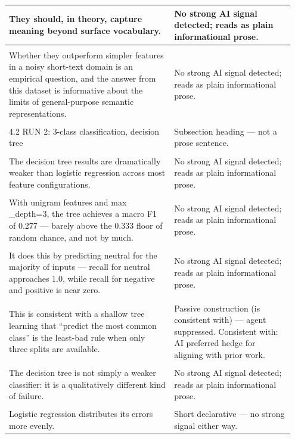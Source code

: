 \documentclass[11pt]{article}
\begin{document}
\begin{longtable}{|p{0.55\linewidth}|p{0.40\linewidth}|}
\hline
They should, in theory, capture meaning beyond surface vocabulary. & No strong AI signal detected; reads as plain informational prose. \\[2pt]
\hline
\rule{0pt}{3.5cm} & \\
\hline
Whether they outperform simpler features in a noisy short-text domain is an empirical question, and the answer from this dataset is informative about the limits of general-purpose semantic representations. & No strong AI signal detected; reads as plain informational prose. \\[2pt]
\hline
\rule{0pt}{3.5cm} & \\
\hline
4.2 RUN 2: 3-class classification, decision tree & Subsection heading --- not a prose sentence. \\[2pt]
\hline
\rule{0pt}{3.5cm} & \\
\hline
The decision tree results are dramatically weaker than logistic regression across most feature configurations. & No strong AI signal detected; reads as plain informational prose. \\[2pt]
\hline
\rule{0pt}{3.5cm} & \\
\hline
With unigram features and max \_depth=3, the tree achieves a macro F1 of 0.277 --- barely above the 0.333 floor of random chance, and not by much. & No strong AI signal detected; reads as plain informational prose. \\[2pt]
\hline
\rule{0pt}{3.5cm} & \\
\hline
It does this by predicting neutral for the majority of inputs --- recall for neutral approaches 1.0, while recall for negative and positive is near zero. & No strong AI signal detected; reads as plain informational prose. \\[2pt]
\hline
\rule{0pt}{3.5cm} & \\
\hline
This is consistent with a shallow tree learning that ``predict the most common class'' is the least-bad rule when only three splits are available. & Passive construction (is consistent with) --- agent suppressed. Consistent with: AI preferred hedge for aligning with prior work. \\[2pt]
\hline
\rule{0pt}{3.5cm} & \\
\hline
The decision tree is not simply a weaker classifier: it is a qualitatively different kind of failure. & No strong AI signal detected; reads as plain informational prose. \\[2pt]
\hline
\rule{0pt}{3.5cm} & \\
\hline
Logistic regression distributes its errors more evenly. & Short declarative --- no strong signal either way. \\[2pt]

\end{longtable}
\end{document}
